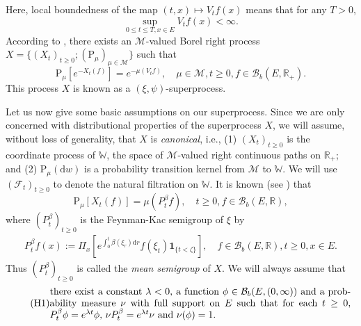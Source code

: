 \documentclass[12pt,a4paper]{amsart}
\numberwithin{equation}{section}
\theoremstyle{plain}
\theoremstyle{definition}
\theoremstyle{remark}
\begin{document}
	Here,  local boundedness of the map $(t,x) \mapsto V_tf(x)$ means that for any $T>0$,
\[
	\sup_{0\leq t\leq T, x\in E} V_tf(x) < \infty.
\]
	According to \cite[Proposition 2.21 and Theorem 5.12]{Li2011Measure-valued}, there exists
	an $\mathcal M$-valued
	Borel right process
		  $X =\{(X_t)_{t\geq 0}; (\mathrm P_\mu)_{\mu \in \mathcal M}\}$ such that
	\begin{equation} \label{eq:M.13}
	\mathrm P_\mu[e^{- X_t(f)}]
	= e^{- \mu(V_tf)},
	\quad \mu\in \mathcal M, t\geq 0, f \in \mathcal B_b(E,\mathbb R_+).
\end{equation}
	This process $X$ is known as a $(\xi, \psi)$-superprocess.
	
	Let us now give some basic assumptions on our superprocess.
	Since we are only concerned with distributional properties of the superprocess $X$, we will assume, without loss of generality, that $X$ is \emph{canonical},  i.e.,
	(1) $(X_t)_{t\geq 0}$ is the coordinate process of
		$\mathbb W$,
		the space of $\mathcal M$-valued right continuous paths on 
$\mathbb R_+$; and 
	(2) $\mathrm P_\mu(\mathrm dw)$ is a probability transition kernel from $\mathcal M$ to $\mathbb W$.
	We will use $(\mathscr F_t)_{t\geq 0}$ to denote the natural filtration on $\mathbb W$.
	It is known (see \cite[Proposition 2.27]{Li2011Measure-valued}) that
\begin{equation} \label{eq:M.2}
	\mathrm P_\mu[X_t(f)] = \mu (P_t^\beta f),
	\quad t\geq 0, f \in \mathcal B_b(E,\mathbb R),
\end{equation}
where $(P_t^\beta)_{t\geq 0}$ is the Feynman-Kac semigroup of $\xi$ by
\begin{align}\label{eq:M.15}
	P_t^\beta f(x)
	:= \Pi_x[e^{\int_0^t \beta(\xi_r) {\mathrm d}r }f(\xi_t) \mathbf 1_{\{t < \zeta\}}],
	\quad f\in \mathcal B_b(E,\mathbb R), t\geq 0, x\in E.
\end{align}
	Thus $(P_t^\beta)_{t\geq 0}$ is called the \emph{mean semigroup}  of $X$.
We will always assume that
\begin{equation}\label{asp:H1} \tag{H1}
\begin{minipage}{0.9\textwidth}
	there exist a constant $\lambda < 0$, a function $\phi \in \mathcal B_b(E,(0,\infty))$ and a probability measure $\nu$ with full support on $E$ such that for each $t\geq 0$, $P_t^\beta \phi = e^{\lambda t} \phi$, $\nu P_t^\beta = e^{\lambda t} \nu$ and $\nu(\phi) =1$.
\end{minipage}
\end{equation}
\end{document}
